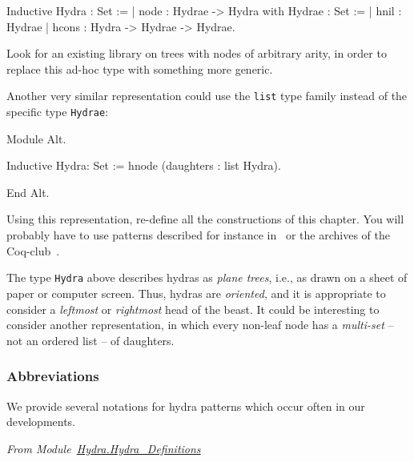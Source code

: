 \begin{Coqsrc}
Inductive Hydra : Set :=
| node :  Hydrae -> Hydra
with Hydrae : Set :=
| hnil : Hydrae
| hcons : Hydra -> Hydrae -> Hydrae.
\end{Coqsrc}


\begin{project}
Look for an existing library on trees with nodes of arbitrary arity, in order to replace  this ad-hoc type with something more generic.
\end{project}



\begin{project}

 Another very similar representation could use the \texttt{list} type family instead of the specific 
type \texttt{Hydrae}:


\begin{Coqalt}
Module Alt.

Inductive Hydra: Set :=
  hnode (daughters : list Hydra).

End Alt.
\end{Coqalt}

Using this representation, re-define all the constructions of this chapter.
You will probably have to use patterns described for instance in~\cite{BC04} or the archives of the Coq-club~\cite{Coq}.

  
\end{project}



\begin{project}
The type \texttt{Hydra} above describes hydras as \emph{plane trees}, i.e., as drawn on a sheet of paper or computer screen. Thus, hydras are \emph{oriented},
and it is appropriate to consider a \emph{leftmost} or \emph{rightmost} head of
the beast. It could be interesting to consider another representation, in which
every non-leaf node has a \emph{multi-set} -- not an ordered list -- of daughters.
\end{project}

\subsubsection{Abbreviations}

We provide several notations for hydra patterns  which occur often in our developments. 

\vspace{4pt}
\noindent
\emph{From Module~\href{../theories/html/hydras.Hydra.Hydra_Definitions.html\#head}{Hydra.Hydra\_Definitions}}

